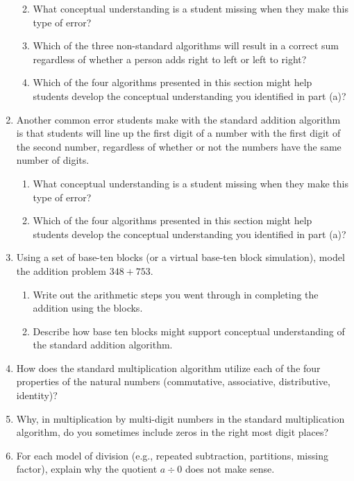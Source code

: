 \documentclass[
]{book}
\providecommand{\tightlist}{%
  \setlength{\itemsep}{0pt}\setlength{\parskip}{0pt}}
\theoremstyle{definition}
\theoremstyle{definition}
\theoremstyle{definition}
\theoremstyle{remark}
\begin{document}
\begin{enumerate}
  \begin{enumerate}
  \def\labelenumii{\alph{enumii}.}
  \tightlist
  \item
    What conceptual understanding is a student missing when they make this type of error?
  \item
    Which of the three non-standard algorithms will result in a correct sum regardless of whether a person adds right to left or left to right?
  \item
    Which of the four algorithms presented in this section might help students develop the conceptual understanding you identified in part (a)?
  \end{enumerate}
\item
  Another common error students make with the standard addition algorithm is that students will line up the first digit of a number with the first digit of the second number, regardless of whether or not the numbers have the same number of digits.

  \begin{enumerate}
  \def\labelenumii{\alph{enumii}.}
  \tightlist
  \item
    What conceptual understanding is a student missing when they make this type of error?
  \item
    Which of the four algorithms presented in this section might help students develop the conceptual understanding you identified in part (a)?
  \end{enumerate}
\item
  Using a set of base-ten blocks (or a virtual base-ten block simulation), model the addition problem \(348+753\).

  \begin{enumerate}
  \def\labelenumii{\alph{enumii}.}
  \tightlist
  \item
    Write out the arithmetic steps you went through in completing the addition using the blocks.
  \item
    Describe how base ten blocks might support conceptual understanding of the standard addition algorithm.
  \end{enumerate}
\item
  How does the standard multiplication algorithm utilize each of the four properties of the natural numbers (commutative, associative, distributive, identity)?
\item
  Why, in multiplication by multi-digit numbers in the standard multiplication algorithm, do you sometimes include zeros in the right most digit places?
\item
  For each model of division (e.g., repeated subtraction, partitions, missing factor), explain why the quotient \(a\div 0\) does not make sense.
\end{enumerate}
\end{document}
